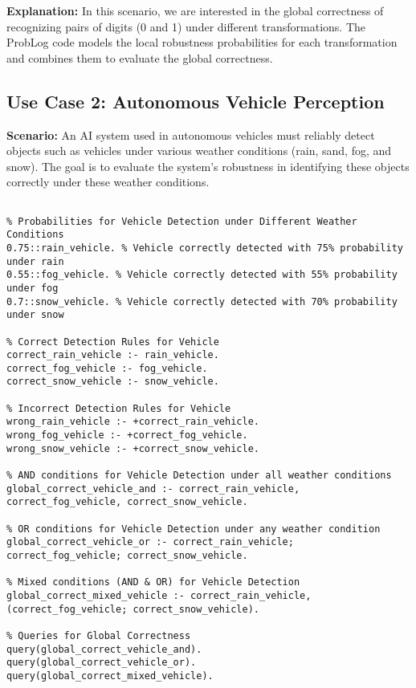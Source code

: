 \textbf{Explanation:} In this scenario, we are interested in the global correctness of recognizing pairs of digits (0 and 1) under different transformations. The ProbLog code models the local robustness probabilities for each transformation and combines them to evaluate the global correctness.

\subsection{Use Case 2: Autonomous Vehicle Perception}

\textbf{Scenario:} An AI system used in autonomous vehicles must reliably detect objects such as vehicles under various weather conditions (rain, sand, fog, and snow). The goal is to evaluate the system's robustness in identifying these objects correctly under these weather conditions.

\begin{mdframed}[leftline=false, rightline=false, topline=true, bottomline=true]
  \scriptsize
  \begin{verbatim}

% Probabilities for Vehicle Detection under Different Weather Conditions
0.75::rain_vehicle. % Vehicle correctly detected with 75% probability under rain
0.55::fog_vehicle. % Vehicle correctly detected with 55% probability under fog
0.7::snow_vehicle. % Vehicle correctly detected with 70% probability under snow

% Correct Detection Rules for Vehicle
correct_rain_vehicle :- rain_vehicle.
correct_fog_vehicle :- fog_vehicle.
correct_snow_vehicle :- snow_vehicle.

% Incorrect Detection Rules for Vehicle
wrong_rain_vehicle :- +correct_rain_vehicle.
wrong_fog_vehicle :- +correct_fog_vehicle.
wrong_snow_vehicle :- +correct_snow_vehicle.

% AND conditions for Vehicle Detection under all weather conditions
global_correct_vehicle_and :- correct_rain_vehicle, correct_fog_vehicle, correct_snow_vehicle.

% OR conditions for Vehicle Detection under any weather condition
global_correct_vehicle_or :- correct_rain_vehicle; correct_fog_vehicle; correct_snow_vehicle.

% Mixed conditions (AND & OR) for Vehicle Detection
global_correct_mixed_vehicle :- correct_rain_vehicle, (correct_fog_vehicle; correct_snow_vehicle).

% Queries for Global Correctness
query(global_correct_vehicle_and).
query(global_correct_vehicle_or).
query(global_correct_mixed_vehicle).
\end{verbatim}
\end{mdframed}

